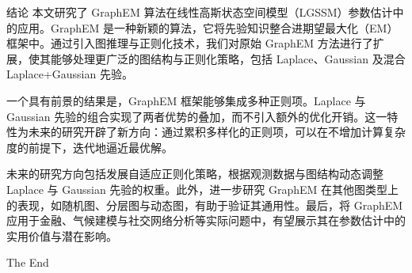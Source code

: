 \documentclass[presentation,aspectratio=169]{ctexbeamer}
\begin{document}
\begin{frame}{结论}
本文研究了 GraphEM 算法在线性高斯状态空间模型（LGSSM）参数估计中的应用。GraphEM 是一种新颖的算法，它将先验知识整合进期望最大化（EM）框架中。通过引入图推理与正则化技术，我们对原始 GraphEM 方法进行了扩展，使其能够处理更广泛的图结构与正则化策略，包括 Laplace、Gaussian 及混合 Laplace+Gaussian 先验。
\vspace{8pt}
\pause

一个具有前景的结果是，GraphEM 框架能够集成多种正则项。Laplace 与 Gaussian 先验的组合实现了两者优势的叠加，而不引入额外的优化开销。这一特性为未来的研究开辟了新方向：通过累积多样化的正则项，可以在不增加计算复杂度的前提下，迭代地逼近最优解。
\vspace{8pt}
\pause

未来的研究方向包括发展自适应正则化策略，根据观测数据与图结构动态调整 Laplace 与 Gaussian 先验的权重。此外，进一步研究 GraphEM 在其他图类型上的表现，如随机图、分层图与动态图，有助于验证其通用性。最后，将 GraphEM 应用于金融、气候建模与社交网络分析等实际问题中，有望展示其在参数估计中的实用价值与潜在影响。
\end{frame}



\begin{frame}
\Huge{\centerline{The End}}
\end{frame}

\begin{frame}

 
\end{frame}

\end{document}
